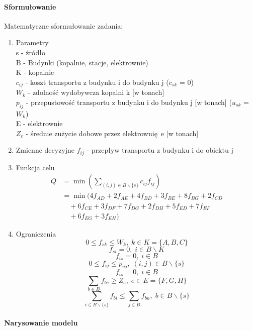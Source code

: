 \paragraph{Sformułowanie}
Matematyczne sformułowanie zadania:
\begin{enumerate}
\item Parametry \\
s - źródło \\
B - Budynki (kopalnie, stacje, elektrownie) \\
K - kopalnie \\
$c_{ij}$ - koszt transportu z budynku i do budynku j ($c_{sk}$ = 0) \\ 
$W_k$ - zdolność wydobywcza kopalni k [w tonach] \\ 
$p_{ij}$ - przepustowość transportu z budynku i do budynku j [w tonach] ($u_{sk}$ = $W_k$) \\ 
E - elektrownie \\ 
$Z_e$ - średnie zużycie dobowe przez elektrownię e [w tonach] \\  
\item Zmienne decyzyjne
$f_{ij}$ - przepływ transportu z budynku i do obiektu j \\ 
\item Funkcja celu
\begin{align*}
    Q &= \min\left(\sum_{(i, j) \in B \backslash \{s\}} c_{ij} f_{ij}\right) \\
    &= \min(4f_{AD} + 2f_{AE} + 4f_{BD} + 3f_{BE} + 8f_{BG} + 2f_{CD} \\
    &\quad + 6f_{CE} + 3f_{DF} + 7f_{DG} + 2f_{DH} + 5f_{ED} + 7f_{EF} \\
    &\quad + 6f_{EG} + 3f_{EH})
\end{align*}

\item Ograniczenia
\begin{equation}
    0 \leq f_{sk} \leq W_k, \; k \in K = \{A, B, C\}
\end{equation}
\begin{equation}
    f_{si} = 0, \; i \in B \backslash K
\end{equation}
\begin{equation}
    f_{is} = 0, \; i \in B
\end{equation}
\begin{equation}
    0 \leq f_{ij} \leq p_{uj}, \; (i, j) \in B \backslash \{s\}
\end{equation}
\begin{equation}
    f_{is} = 0, \; i \in B
\end{equation}
\begin{equation}
    \sum_{b \in B} f_{be} \ge Z_e, \; e \in E = \{F, G, H\}
\end{equation}
\begin{equation}
    \sum_{i \in B \backslash \{ s \} } f_{bi} \leq \sum_{j \in B} f_{bn}, \; b \in B \backslash \{s\}
\end{equation}

\end{enumerate}
\paragraph{Narysowanie modelu}


